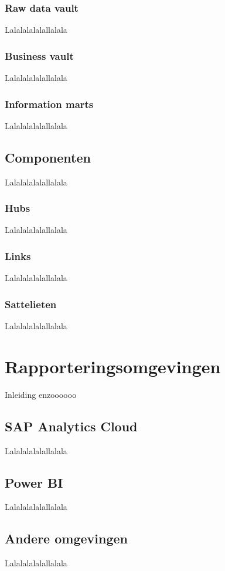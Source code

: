 \subsubsection{Raw data vault}
Lalalalalalallalala

\subsubsection{Business vault}
Lalalalalalallalala

\subsubsection{Information marts}
Lalalalalalallalala

\subsection{Componenten}
Lalalalalalallalala

\subsubsection{Hubs}
Lalalalalalallalala

\subsubsection{Links}
Lalalalalalallalala

\subsubsection{Sattelieten}
Lalalalalalallalala

\section{Rapporteringsomgevingen}
Inleiding enzoooooo

\subsection{SAP Analytics Cloud}
Lalalalalalallalala

\subsection{Power BI}
Lalalalalalallalala

\subsection{Andere omgevingen}
Lalalalalalallalala





